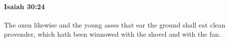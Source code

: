 
		\paragraph{Isaiah 30:24} %
			\label{ISAIAH-30-24}

			The oxen likewise and the young asses that ear the ground shall eat clean provender, which hath been winnowed with the shovel and with the fan.


